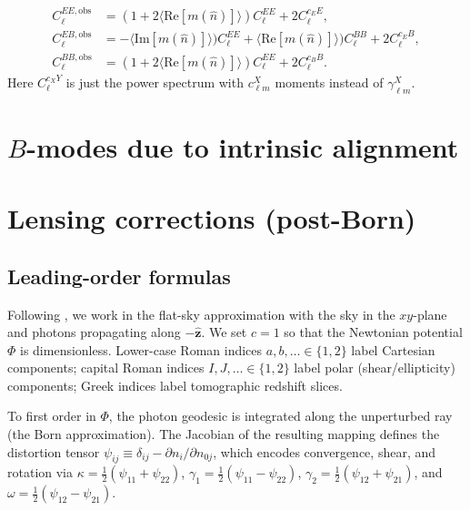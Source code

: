 \documentclass[11pt]{book}
\newcommand{\sbr}[1]{\ensuremath{\left[ #1 \right]}}
\begin{document}
\begin{align}
	C^{EE,\text{obs}}_\ell &=(1+2\langle \text{Re}\sbr{m(\hat n)}\rangle)C^{EE}_\ell + 2C^{c_EE}_\ell, \\ 
	C^{EB,\text{obs}}_\ell &=-\langle \text{Im}\sbr{m(\hat n)}\rangle)C^{EE}_\ell + \langle \text{Re}\sbr{m(\hat n)}\rangle)C^{BB}_\ell+ 2C^{c_EB}_\ell, \\
	C^{BB,\text{obs}}_\ell &=(1+2\langle \text{Re}\sbr{m(\hat n)}\rangle)C^{EE}_\ell + 2C^{c_BB}_\ell.
\end{align}
Here $C^{c_XY}_\ell$ is just the power spectrum with $c^X_{\ell m}$ moments instead of $\gamma^X_{\ell m}$.

\section{$B$-modes due to intrinsic alignment}


\section{Lensing corrections (post-Born)}
\subsection{Leading-order formulas}
\label{sec:leading_order}

Following \cite{Krause_2010}, we work in the flat-sky approximation with the sky in the $xy$-plane and photons propagating along $-\hat{\mathbf{z}}$. We set $c=1$ so that the Newtonian potential $\Phi$ is dimensionless. Lower-case Roman indices $a,b,\ldots \in \{1,2\}$ label Cartesian components; capital Roman indices $I,J,\ldots \in \{1,2\}$ label polar (shear/ellipticity) components; Greek indices label tomographic redshift slices.

To first order in $\Phi$, the photon geodesic is integrated along the unperturbed ray (the Born approximation). The Jacobian of the resulting mapping defines the distortion tensor $\psi_{ij} \equiv \delta_{ij} - \partial n_i/\partial n_{0j}$, which encodes convergence, shear, and rotation via $\kappa = \tfrac{1}{2}(\psi_{11}+\psi_{22})$, $\gamma_1 = \tfrac{1}{2}(\psi_{11}-\psi_{22})$, $\gamma_2 = \tfrac{1}{2}(\psi_{12}+\psi_{21})$, and $\omega = \tfrac{1}{2}(\psi_{12}-\psi_{21})$.
\end{document}
